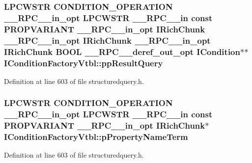 \subsubsection[{\texorpdfstring{pp\+Result\+Query}{ppResultQuery}}]{ {\bf L\+P\+C\+W\+S\+TR} {\bf C\+O\+N\+D\+I\+T\+I\+O\+N\+\_\+\+O\+P\+E\+R\+A\+T\+I\+ON} {\bf \+\_\+\+\_\+\+R\+P\+C\+\_\+\+\_\+in\+\_\+opt} {\bf L\+P\+C\+W\+S\+TR} {\bf \+\_\+\+\_\+\+R\+P\+C\+\_\+\+\_\+in} {\bf const} {\bf P\+R\+O\+P\+V\+A\+R\+I\+A\+NT} {\bf \+\_\+\+\_\+\+R\+P\+C\+\_\+\+\_\+in\+\_\+opt} {\bf I\+Rich\+Chunk} {\bf \+\_\+\+\_\+\+R\+P\+C\+\_\+\+\_\+in\+\_\+opt} {\bf I\+Rich\+Chunk} {\bf \+\_\+\+\_\+\+R\+P\+C\+\_\+\+\_\+in\+\_\+opt} {\bf I\+Rich\+Chunk} {\bf B\+O\+OL} {\bf \+\_\+\+\_\+\+R\+P\+C\+\_\+\+\_\+deref\+\_\+out\+\_\+opt} {\bf I\+Condition}$\ast$$\ast$ I\+Condition\+Factory\+Vtbl\+::pp\+Result\+Query}\hypertarget{struct_i_condition_factory_vtbl_ac2b12f90d045d5e111eeba802e8c8051}{}\label{struct_i_condition_factory_vtbl_ac2b12f90d045d5e111eeba802e8c8051}


Definition at line 603 of file structuredquery.\+h.

\subsubsection[{\texorpdfstring{p\+Property\+Name\+Term}{pPropertyNameTerm}}]{ {\bf L\+P\+C\+W\+S\+TR} {\bf C\+O\+N\+D\+I\+T\+I\+O\+N\+\_\+\+O\+P\+E\+R\+A\+T\+I\+ON} {\bf \+\_\+\+\_\+\+R\+P\+C\+\_\+\+\_\+in\+\_\+opt} {\bf L\+P\+C\+W\+S\+TR} {\bf \+\_\+\+\_\+\+R\+P\+C\+\_\+\+\_\+in} {\bf const} {\bf P\+R\+O\+P\+V\+A\+R\+I\+A\+NT} {\bf \+\_\+\+\_\+\+R\+P\+C\+\_\+\+\_\+in\+\_\+opt} {\bf I\+Rich\+Chunk}$\ast$ I\+Condition\+Factory\+Vtbl\+::p\+Property\+Name\+Term}\hypertarget{struct_i_condition_factory_vtbl_a76802f9976c2ca41d3e86ffc0e8ba287}{}\label{struct_i_condition_factory_vtbl_a76802f9976c2ca41d3e86ffc0e8ba287}


Definition at line 603 of file structuredquery.\+h.

